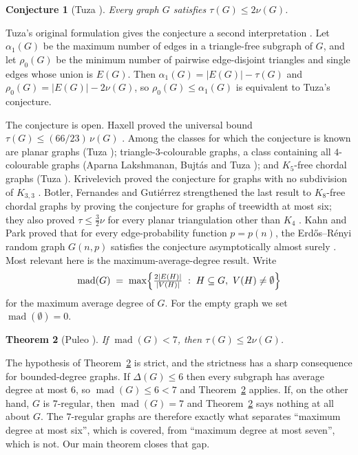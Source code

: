 \documentclass[11pt,a4paper]{amsart}
\theoremstyle{plain}
\newtheorem{theorem}{Theorem}[section]
\newtheorem{conjecture}[theorem]{Conjecture}
\theoremstyle{definition}
\newcommand{\mad}{\operatorname{mad}}
\begin{document}
\begin{conjecture}[Tuza \cite{Tuza1981,Tuza1990}]
Every graph $G$ satisfies $\tau(G)\le 2\nu(G)$.
\end{conjecture}

Tuza's original formulation gives the conjecture a second interpretation
\cite{Tuza1981}. Let $\alpha_1(G)$ be the maximum number of edges in a
triangle-free subgraph of $G$, and let $\rho_0(G)$ be the minimum number of
pairwise edge-disjoint triangles and single edges whose union is $E(G)$.
Then $\alpha_1(G)=|E(G)|-\tau(G)$ and
$\rho_0(G)=|E(G)|-2\nu(G)$, so $\rho_0(G)\le\alpha_1(G)$ is equivalent to
Tuza's conjecture.

The conjecture is open. Haxell proved the universal bound
$\tau(G)\le (66/23)\,\nu(G)$ \cite{Haxell1999}. Among the classes for which the
conjecture is known are planar graphs (Tuza \cite{Tuza1990});
triangle-$3$-colourable graphs, a class containing all $4$-colourable graphs
(Aparna Lakshmanan, Bujt\'as and Tuza \cite{AparnaBujtasTuza2012}); and
$K_5$-free chordal graphs (Tuza \cite[Proposition 3(b)]{Tuza1990}).
Krivelevich proved the conjecture for graphs with no subdivision of $K_{3,3}$
\cite{Krivelevich1995}. Botler,
Fernandes and Guti\'errez strengthened the last result to $K_8$-free chordal
graphs by proving the conjecture for graphs of treewidth at most six; they
also proved $\tau\le\tfrac32\nu$ for every planar triangulation other than
$K_4$ \cite{BotlerFG2021}.
Kahn and Park proved that for every edge-probability function $p=p(n)$, the
Erd\H{o}s--R\'enyi random graph $G(n,p)$ satisfies the conjecture
asymptotically almost surely \cite{KahnPark2022}. Most relevant here is the
maximum-average-degree result. Write
\[
  \mad(G)\;=\;\max\Bigl\{\tfrac{2|E(H)|}{|V(H)|}\;:\;
    H\subseteq G,\ V(H)\neq\emptyset\Bigr\}
\]
for the maximum average degree of $G$.
For the empty graph we set $\mad(\emptyset)=0$.

\begin{theorem}[Puleo {\cite[Theorem 1.2]{Puleo2015}}]\label{thm:puleo}
If $\mad(G)<7$, then $\tau(G)\le 2\nu(G)$.
\end{theorem}

The hypothesis of Theorem~\ref{thm:puleo} is strict, and the strictness has a
sharp consequence for bounded-degree graphs. If $\Delta(G)\le 6$ then every
subgraph has average degree at most $6$, so $\mad(G)\le 6<7$ and
Theorem~\ref{thm:puleo} applies. If, on the other hand, $G$ is $7$-regular,
then $\mad(G)=7$ and Theorem~\ref{thm:puleo} says nothing at all about $G$.
The $7$-regular graphs are therefore exactly what separates ``maximum degree
at most six'', which is covered, from ``maximum degree at most seven'', which
is not. Our main theorem closes that gap.
\end{document}
